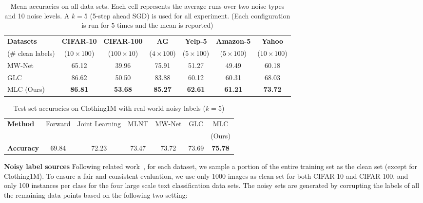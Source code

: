 \begin{table*}[h]
  \small
  \centering
  \begin{tabular}{l|cc|cccc}\toprule
   \textbf{Datasets} & \textbf{CIFAR-10} & \textbf{CIFAR-100} &\textbf{AG} & \textbf{Yelp-5}& \textbf{Amazon-5} & \textbf{Yahoo}\\
   ($\#$ clean labels) & ($10\times 100$) & ($100\times 10$)& ($4\times 100$)       &  ($5\times 100$)           &  ($5\times 100$)        &  ($10\times 100$)     \\\midrule
   MW-Net~\cite{shu2019meta} & 65.12 & 39.96 & 75.91&  51.27& 49.49 & 60.18     \\
   GLC~\cite{hendrycks2018using} & 86.62 & 50.50 & 83.88 & 60.12 & 60.31 & 68.03\\
   MLC (Ours)  & \bf{86.81} & \bf{53.68} &\bf{85.27}&  \bf{62.61}&  \bf{61.21}&  \bf{73.72}      \\ 
  \bottomrule
  \end{tabular}
    \vspace{-0.1in}
\caption{Mean accuracies on all data sets. Each cell represents the
  average runs over two noise types and 10 noise levels. A $k=5$
  (5-step ahead SGD) is used for all experiment. (Each configuration
  is run for 5 times and the mean is reported)}
\label{tab:summary}
\end{table*}
\begin{table*}[h!]
  \small
  \centering
\begin{tabular}{lcccccc}\toprule
  \textbf{Method} & Forward & Joint Learning  & MLNT & MW-Net & GLC &MLC \\
   & \cite{patrini2017making} & \cite{tanaka2018joint}  & \cite{li2019learning} & \cite{shu2019meta} & \cite{hendrycks2018using} & (Ours) \\
  \midrule
  \textbf{Accuracy} & 69.84 & 72.23 & 73.47 & 73.72 &73.69 &\bf{75.78}\\
\bottomrule
\end{tabular}
\vspace{-0.1in}
\caption{Test set accuracies on Clothing1M with real-world noisy labels ($k=5$)}
\label{tab:clothing1m}
\vspace{-0.1in}
\end{table*}


\textbf{Noisy label sources}
Following related work~\cite{hendrycks2018using,ren2018learning,shu2019meta}, for each dataset, we sample a
portion of the entire training set as the clean set (except for
Clothing1M). To ensure a fair and consistent evaluation, we use only
1000 images as clean set for both CIFAR-10 and CIFAR-100, and only 100
instances per class for the four large scale text classification data
sets. The noisy sets are generated by corrupting the
labels of all the remaining data points based on the following two
setting:

